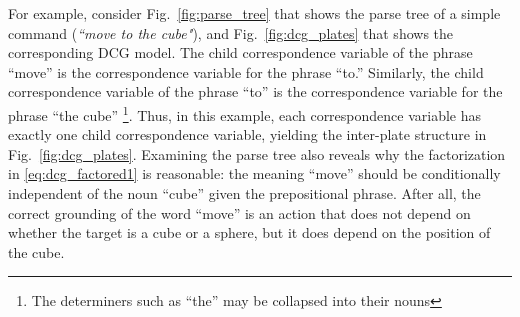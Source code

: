 For example, consider Fig.~\ref{fig:parse_tree} that shows the parse tree of a simple command (\emph{``move to the cube"}), and Fig.~\ref{fig:dcg_plates} that shows the corresponding DCG model. The child correspondence variable of the phrase ``move'' is the correspondence variable for the phrase ``to.'' Similarly, the child correspondence variable of the phrase ``to'' is the correspondence variable for the phrase ``the cube'' \footnote{The determiners such as ``the'' may be collapsed into their nouns}. Thus, in this example, each correspondence variable has exactly one child correspondence variable, yielding the inter-plate structure in Fig.~\ref{fig:dcg_plates}.
Examining the parse tree also reveals why the factorization in \eqref{eq:dcg_factored1} is reasonable: the meaning ``move'' should be conditionally independent of the noun ``cube'' given the prepositional phrase.
After all, the correct grounding of the word ``move'' is an action that does not depend on whether the target is a cube or a sphere, but it does depend on the position of the cube.


